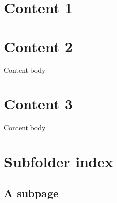 

\pagestyle{empty}
\sphinxmaketitle
\pagestyle{plain}
\sphinxtableofcontents
\pagestyle{normal}
\label{\detokenize{index::doc}}


\sphinxAtStartPar
{}


\chapter{Content 1}
\label{\detokenize{content1:content-1}}\label{\detokenize{content1::doc}}

\chapter{Content 2}
\label{\detokenize{content2:content-2}}\label{\detokenize{content2::doc}}
\sphinxAtStartPar
Content body


\chapter{Content 3}
\label{\detokenize{content3:content-3}}\label{\detokenize{content3::doc}}
\sphinxAtStartPar
Content body


\chapter{Subfolder index}
\label{\detokenize{subfolder/index:subfolder-index}}\label{\detokenize{subfolder/index::doc}}
\sphinxAtStartPar
{}


\section{A subpage}
\label{\detokenize{subfolder/asubpage:a-subpage}}\label{\detokenize{subfolder/asubpage::doc}}






\renewcommand{\indexname}{Index}
\printindex
